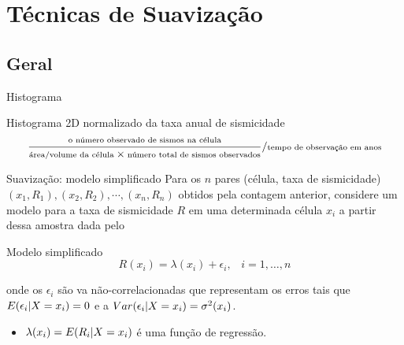 \documentclass[ucs,8pt]{beamer}
\begin{document}
\section{Técnicas de Suavização}
\subsection{Geral}
\begin{frame}{Histograma}
	\begin{block}{Histograma 2D normalizado da taxa anual de sismicidade}
		\begin{equation}
		\scriptsize
			\ensuremath{
			\frac{\text{o número observado de sismos na célula}}
				 {\text{área/volume da célula} \times 
				  \text{número total de sismos observados}}
			/
			\text{tempo de observação em anos}
			}
		\label{eq:rate_count}
		\end{equation}
	\end{block}
\end{frame}


\begin{frame}{Suavização: modelo simplificado}
Para os $n$ pares (célula, taxa de sismicidade) $(x_1, R_1), (x_2, R_2), \cdots, (x_n, R_n)$
obtidos pela contagem anterior, considere um modelo para a taxa de sismicidade $R$ 
em uma determinada célula $x_i$ a partir dessa amostra dada pelo
	\begin{block}{Modelo simplificado}
		\begin{equation}
			\ensuremath{
				R(x_i) = \lambda(x_i) + \epsilon_i,\;\;\; i=1,\dots,n
			}
		\label{eq:rate_model}
		\end{equation}
	\end{block}
	onde os $\epsilon_i$ são \gls{va} não-correlacionadas que
	representam os erros tais que $E(\epsilon_i \arrowvert X = x_i) = 0$ 
	e a $Var(\epsilon_i \arrowvert X = x_i) = \sigma^2(x_i)$. 
	
	\begin{itemize}
	  \item $\lambda(x_i) = E(R_i \arrowvert X = x_i)$ é uma função de regressão.
	\end{itemize}
\end{frame}
\end{document}
